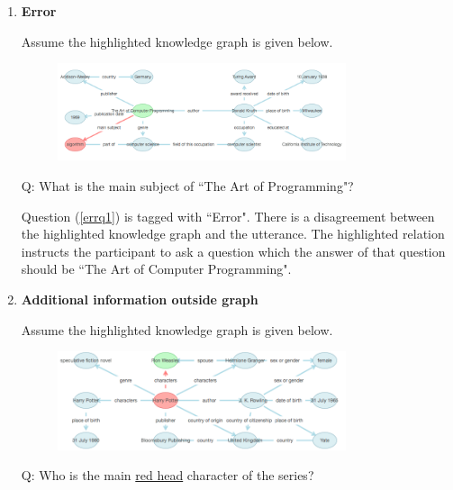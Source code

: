 \documentclass[bsc,frontabs,twoside,singlespacing,parskip,deptreport]{infthesis}     %
\begin{document}
\begin{enumerate}
\item \textbf{Error}

Assume the highlighted knowledge graph is given below.

\begin{figure}[h]
    \centering
    \includegraphics[width=0.8\textwidth]{error.png}
\end{figure}

\begin{exe}
	\ex
		\begin{xlist}
			\ex \label{errq1} Q: What is the main subject of ``The Art of Programming"?
\end{xlist}
\end{exe}

Question (\ref{errq1}) is tagged with ``Error". There is a disagreement between the highlighted knowledge graph and the utterance. The highlighted relation instructs the participant to ask a question which the answer of that question should be ``The Art of Computer Programming".



\item \textbf{Additional information outside graph}

Assume the highlighted knowledge graph is given below.

\begin{figure}[h]
    \centering
    \includegraphics[width=0.8\textwidth]{aiog.png}
\end{figure}

\begin{exe}
	\ex
		\begin{xlist}
			\ex \label{errq1} Q: Who is the main \underline{red head} character of the series?
\end{xlist}
\end{exe}


\end{enumerate}
\end{document}
